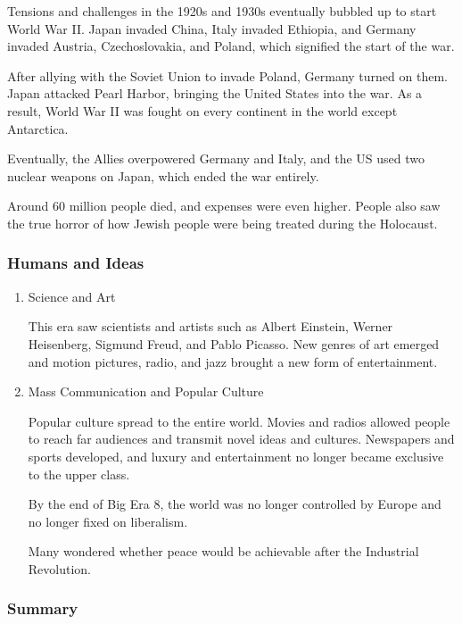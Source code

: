 \documentclass[11pt]{article}
\begin{document}
\begin{enumerate}
Tensions and challenges in the 1920s and 1930s eventually bubbled up to start World War II. Japan invaded China, Italy invaded Ethiopia, and Germany invaded Austria, Czechoslovakia, and Poland, which signified the start of the war.

After allying with the Soviet Union to invade Poland, Germany turned on them. Japan attacked Pearl Harbor, bringing the United States into the war. As a result, World War II was fought on every continent in the world except Antarctica.

Eventually, the Allies overpowered Germany and Italy, and the US used two nuclear weapons on Japan, which ended the war entirely.

Around 60 million people died, and expenses were even higher. People also saw the true horror of how Jewish people were being treated during the Holocaust.
\end{enumerate}

\subsubsection{Humans and Ideas}
\label{sec:orgb723e22}
\begin{enumerate}
\item Science and Art
\label{sec:org12d743d}

This era saw scientists and artists such as Albert Einstein, Werner Heisenberg, Sigmund Freud, and Pablo Picasso. New genres of art emerged and motion pictures, radio, and jazz brought a new form of entertainment.

\item Mass Communication and Popular Culture
\label{sec:org1a6dbf5}

Popular culture spread to the entire world. Movies and radios allowed people to reach far audiences and transmit novel ideas and cultures. Newspapers and sports developed, and luxury and entertainment no longer became exclusive to the upper class.

By the end of Big Era 8, the world was no longer controlled by Europe and no longer fixed on liberalism.

Many wondered whether peace would be achievable after the Industrial Revolution.
\end{enumerate}

\subsubsection{Summary}
\label{sec:org13796bd}
\end{document}
